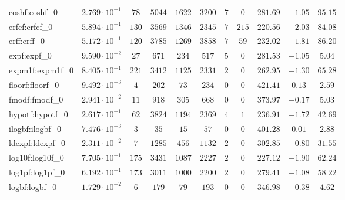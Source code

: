 \begin{tabular}{|l|c|c|c|c|c|c|c|c|c|c|}
coshf:coshf\_0               & $ 2.769 \cdot 10^{-1} $ & $ 78     $ & $ 5044  $ & $ 1622  $ & $ 3200  $ & $ 7   $ & $ 0   $ & $ 281.69      $ & $ -1.05   $ & $ 95.15   $ \\
erfcf:erfcf\_0               & $ 5.894 \cdot 10^{-1} $ & $ 130    $ & $ 3569  $ & $ 1346  $ & $ 2345  $ & $ 7   $ & $ 215 $ & $ 220.56      $ & $ -2.03   $ & $ 84.08   $ \\
erff:erff\_0                 & $ 5.172 \cdot 10^{-1} $ & $ 120    $ & $ 3785  $ & $ 1269  $ & $ 3858  $ & $ 7   $ & $ 59  $ & $ 232.02      $ & $ -1.81   $ & $ 86.20   $ \\
expf:expf\_0                 & $ 9.590 \cdot 10^{-2} $ & $ 27     $ & $ 671   $ & $ 234   $ & $ 517   $ & $ 5   $ & $ 0   $ & $ 281.53      $ & $ -1.05   $ & $ 5.04    $ \\
expm1f:expm1f\_0             & $ 8.405 \cdot 10^{-1} $ & $ 221    $ & $ 3412  $ & $ 1125  $ & $ 2331  $ & $ 2   $ & $ 0   $ & $ 262.95      $ & $ -1.30   $ & $ 65.28   $ \\
floorf:floorf\_0             & $ 9.492 \cdot 10^{-3} $ & $ 4      $ & $ 202   $ & $ 73    $ & $ 234   $ & $ 0   $ & $ 0   $ & $ 421.41      $ & $ 0.13    $ & $ 2.59    $ \\
fmodf:fmodf\_0               & $ 2.941 \cdot 10^{-2} $ & $ 11     $ & $ 918   $ & $ 305   $ & $ 668   $ & $ 0   $ & $ 0   $ & $ 373.97      $ & $ -0.17   $ & $ 5.03    $ \\
hypotf:hypotf\_0             & $ 2.617 \cdot 10^{-1} $ & $ 62     $ & $ 3824  $ & $ 1194  $ & $ 2369  $ & $ 4   $ & $ 1   $ & $ 236.91      $ & $ -1.72   $ & $ 42.69   $ \\
ilogbf:ilogbf\_0             & $ 7.476 \cdot 10^{-3} $ & $ 3      $ & $ 35    $ & $ 15    $ & $ 57    $ & $ 0   $ & $ 0   $ & $ 401.28      $ & $ 0.01    $ & $ 2.88    $ \\
ldexpf:ldexpf\_0             & $ 2.311 \cdot 10^{-2} $ & $ 7      $ & $ 1285  $ & $ 456   $ & $ 1132  $ & $ 2   $ & $ 0   $ & $ 302.85      $ & $ -0.80   $ & $ 31.55   $ \\
log10f:log10f\_0             & $ 7.705 \cdot 10^{-1} $ & $ 175    $ & $ 3431  $ & $ 1087  $ & $ 2227  $ & $ 2   $ & $ 0   $ & $ 227.12      $ & $ -1.90   $ & $ 62.24   $ \\
log1pf:log1pf\_0             & $ 6.192 \cdot 10^{-1} $ & $ 173    $ & $ 3011  $ & $ 1000  $ & $ 2200  $ & $ 2   $ & $ 0   $ & $ 279.41      $ & $ -1.08   $ & $ 58.22   $ \\
logbf:logbf\_0               & $ 1.729 \cdot 10^{-2} $ & $ 6      $ & $ 179   $ & $ 79    $ & $ 193   $ & $ 0   $ & $ 0   $ & $ 346.98      $ & $ -0.38   $ & $ 4.62    $ \\

\end{tabular}

